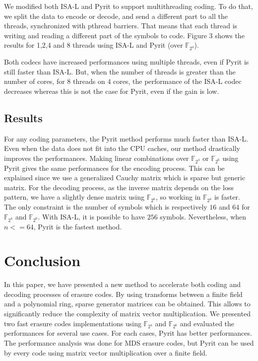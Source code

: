 \documentclass[conference]{IEEEtran}
\begin{document}
We modified both ISA-L and Pyrit to support multithreading coding. To do that, we split the data to encode or decode, and send a different part to all the threads, synchronized with pthread barriers. That means that each thread is writing and reading a different part of the symbols to code. Figure 3 shows the results for 1,2,4 and 8 threads using ISA-L and Pyrit (over $\mathbb{F}_{2^4}$).

Both codecs have increased performances using multiple threads, even if Pyrit is still faster than ISA-L.
But, when the number of threads is greater than the number of cores, for $8$ threads on $4$ cores, the performance of the ISA-L codec decreases whereas this is not the case for Pyrit, even if the gain is low.

\subsection{Results}

For any coding parameters, the Pyrit method performs much faster than ISA-L. Even when the data does not fit into the CPU caches, our method drastically improves the performances.
Making linear combinations over $\mathbb{F}_{2^4}$ or $\mathbb{F}_{2^6}$ using Pyrit gives the same performances for the encoding process. This can be explained since we use a generalized Cauchy matrix which is sparse but generic matrix. For the decoding process, as the inverse matrix depends on the loss pattern, we have a slightly dense matrix using $\mathbb{F}_{2^6}$, so working in $\mathbb{F}_{2^4}$ is faster.
The only constraint is the number of symbols which is respectively $16$ and $64$ for $\mathbb{F}_{2^4}$ and $\mathbb{F}_{2^6}$. With ISA-L, it is possible to have $256$ symbols. Nevertheless, when $n<=64$, Pyrit is the fastest method.

\section{Conclusion}
\label{sec:ccl}

In this paper, we have presented a new method to accelerate both coding and decoding processes of erasure codes. By using transforms between a finite field and a polynomial ring, sparse generator matrices can be obtained. This allows to significantly reduce the complexity of matrix vector multiplication. 
We presented two fast erasure codes implementations using $\mathbb{F}_{2^4}$ and $\mathbb{F}_{2^6}$ and evaluated the performances for several use cases. For each cases, Pyrit has better performances. The performance analysis was done for MDS erasure codes, but Pyrit can be used by every code using matrix vector multiplication over a finite field.


	
\end{document}
